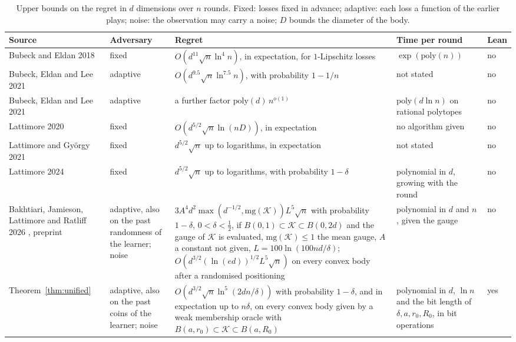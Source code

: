 \documentclass[11pt]{amsart}
\newcommand{\rowsep}{\arrayrulecolor{black!30}\specialrule{0.4pt}{2pt}{2pt}\arrayrulecolor{black}}
\theoremstyle{definition}
\numberwithin{equation}{section}
\newcommand{\cK}{\mathcal{K}}
\begin{document}
\begin{table}[ht]
\centering\small
\caption{Upper bounds on the regret in $d$ dimensions over $n$ rounds. Fixed: losses fixed in advance; adaptive: each loss a function of the earlier plays; noise: the observation may carry a noise; $D$ bounds the diameter of the body.}\label{tab:upper}
\begin{tabular}{@{}>{\raggedright\arraybackslash}p{}>{\raggedright\arraybackslash}p{}>{\raggedright\arraybackslash}p{}>{\raggedright\arraybackslash}p{}l@{}}
\toprule
Source & Adversary & Regret & Time per round & Lean\\
\midrule
Bubeck and Eldan 2018 \cite[Theorem~1.3]{BE18} & fixed & $O(d^{11}\sqrt n\ln^4n)$, in expectation, for $1$-Lipschitz losses & $\exp(\mathrm{poly}(n))$ \cite{BEL21} & no\\\rowsep
Bubeck, Eldan and Lee 2021 \cite[Theorem~1]{BEL21} & adaptive & $O(d^{9.5}\sqrt n\ln^{7.5}n)$, with probability $1-1/n$ & not stated & no\\\rowsep
Bubeck, Eldan and Lee 2021 \cite[Theorem~1]{BEL21} & adaptive & a further factor $\mathrm{poly}(d)\,n^{o(1)}$ & $\mathrm{poly}(d\ln n)$ on rational polytopes & no\\\rowsep
Lattimore 2020 \cite[Theorem~1]{Lat20} & fixed & $O(d^{5/2}\sqrt n\ln(nD))$, in expectation & no algorithm given & no\\\rowsep
Lattimore and Gy\"orgy 2021 \cite[Section~8]{LG21} & fixed & $d^{5/2}\sqrt n$ up to logarithms, in expectation & not stated & no\\\rowsep
Lattimore 2024 \cite[Chapter~11]{Lat24} & fixed & $d^{5/2}\sqrt n$ up to logarithms, with probability $1-\delta$ & polynomial in $d$, growing with the round & no\\\rowsep
Bakhtiari, Jamieson, Lattimore and Ratliff 2026 \cite[Theorem~2 and Proposition~13]{BJLR26}, preprint & adaptive, also on the past randomness of the learner; noise & $3A^4d^2\max(d^{-1/2},\allowbreak\mathrm{mg}(\cK))L^5\sqrt n$ with probability $1-\delta$, $0<\delta<\frac12$, if $B(0,1)\subset\cK\subset B(0,2d)$ and the gauge of $\cK$ is evaluated, $\mathrm{mg}(\cK)\le1$ the mean gauge, $A$ a constant not given, $L=100\ln(100nd/\delta)$; $O(d^{3/2}(\ln(ed))^{1/2}L^5\sqrt n)$ on every convex body after a randomised positioning & polynomial in $d$ and $n$, given the gauge & no\\\rowsep
Theorem~\ref{thm:unified} & adaptive, also on the past coins of the learner; noise & $O(d^{3/2}\sqrt n\ln^5(2dn/\delta))$ with probability $1-\delta$, and in expectation up to $n\delta$, on every convex body given by a weak membership oracle with $B(a,r_0)\subset\cK\subset B(a,R_0)$ & polynomial in $d$, $\ln n$ and the bit length of $\delta,a,r_0,R_0$, in bit operations & yes\\
\bottomrule
\end{tabular}
\end{table}
\end{document}
